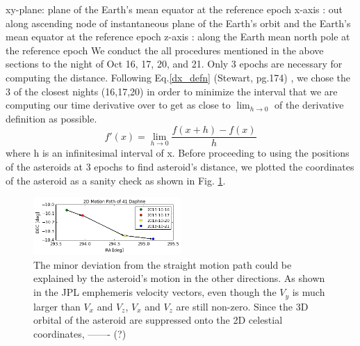 \documentclass[authoryear, 12pt,5p, times]{elsarticle}
\begin{document}
	 xy-plane: plane of the Earth's mean equator at the reference epoch
    x-axis  : out along ascending node of instantaneous plane of the Earth's
              orbit and the Earth's mean equator at the reference epoch
    z-axis  : along the Earth mean north pole at the reference epoch
We conduct the all procedures mentioned in the above sections to the night of Oct 16, 17, 20, and 21. Only 3 epochs are necessary for computing the distance.  Following Eq.\ref{dx_defn} (Stewart, pg.174) , we chose the 3 of the closest nights (16,17,20)  in order to minimize the interval that we are computing our time derivative over to get as close to $\lim_{h\rightarrow 0}$ of the derivative definition as possible.
\begin{equation}
f'(x) = \lim_{h\rightarrow 0}\frac{f(x+h)-f(x)}{h}
\label{dx_defn}
\end{equation}
where h is an infinitesimal interval of x. Before proceeding to using the positions of the asteroids at 3 epochs to find  asteroid's distance, we plotted the coordinates of the asteroid as a sanity check as shown in Fig. \ref{motion_path}.
\begin{figure}[h!]
\includegraphics[width=0.5\textwidth]{figures/motion_path}
\caption{The minor deviation from the straight motion path could be explained by the asteroid's motion in the other directions. As shown in the JPL emphemeris velocity vectors, even though the $V_y$ is much larger than $V_x$ and $V_z$, $V_x$ and $V_z$ are still non-zero. Since the 3D orbital of the asteroid are suppressed onto the 2D celestial coordinates, ------- (?)}
\label{motion_path}
\end{figure}
\end{document}
